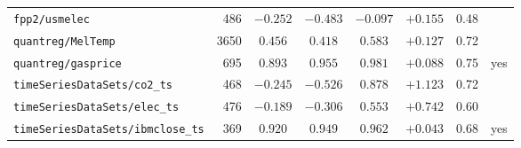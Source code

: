\begin{tabular}{lrcccccc}
\texttt{fpp2/usmelec} & 486 & $-0.252$ & $-0.483$ & $-0.097$ & $+0.155$ & 0.48 &  \\
\texttt{quantreg/MelTemp} & 3650 & $0.456$ & $0.418$ & $0.583$ & $+0.127$ & 0.72 &  \\
\texttt{quantreg/gasprice} & 695 & $0.893$ & $0.955$ & $0.981$ & $+0.088$ & 0.75 & yes \\
\texttt{timeSeriesDataSets/co2\_ts} & 468 & $-0.245$ & $-0.526$ & $0.878$ & $+1.123$ & 0.72 &  \\
\texttt{timeSeriesDataSets/elec\_ts} & 476 & $-0.189$ & $-0.306$ & $0.553$ & $+0.742$ & 0.60 &  \\
\texttt{timeSeriesDataSets/ibmclose\_ts} & 369 & $0.920$ & $0.949$ & $0.962$ & $+0.043$ & 0.68 & yes \\
\bottomrule
\end{tabular}
